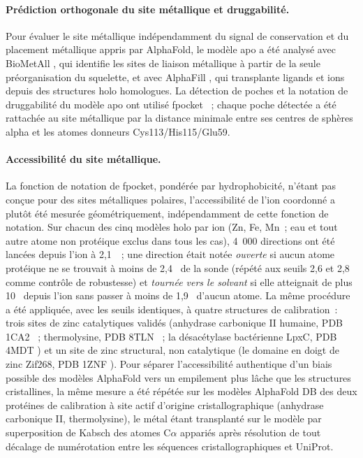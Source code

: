 \documentclass[11pt,a4paper]{article}
\newcommand{\ang}{\text{\AA}}
\begin{document}
\paragraph{Prédiction orthogonale du site métallique et druggabilité.} Pour évaluer le site métallique indépendamment du signal de conservation et du placement métallique appris par AlphaFold, le modèle apo a été analysé avec BioMetAll \citep{sanchezaparicio2021biometall}, qui identifie les sites de liaison métallique à partir de la seule préorganisation du squelette, et avec AlphaFill \citep{hekkelman2023alphafill}, qui transplante ligands et ions depuis des structures holo homologues. La détection de poches et la notation de druggabilité du modèle apo ont utilisé fpocket \citep{leguilloux2009fpocket}~; chaque poche détectée a été rattachée au site métallique par la distance minimale entre ses centres de sphères alpha et les atomes donneurs Cys113/His115/Glu59.

\paragraph{Accessibilité du site métallique.} La fonction de notation de fpocket, pondérée par hydrophobicité, n'étant pas conçue pour des sites métalliques polaires, l'accessibilité de l'ion coordonné a plutôt été mesurée géométriquement, indépendamment de cette fonction de notation. Sur chacun des cinq modèles holo par ion (Zn, Fe, Mn~; eau et tout autre atome non protéique exclus dans tous les cas), 4~000 directions ont été lancées depuis l'ion à 2,1~\ang{}~; une direction était notée \emph{ouverte} si aucun atome protéique ne se trouvait à moins de 2,4~\ang{} de la sonde (répété aux seuils 2,6 et 2,8~\ang{} comme contrôle de robustesse) et \emph{tournée vers le solvant} si elle atteignait de plus 10~\ang{} depuis l'ion sans passer à moins de 1,9~\ang{} d'aucun atome. La même procédure a été appliquée, avec les seuils identiques, à quatre structures de calibration~: trois sites de zinc catalytiques validés (anhydrase carbonique II humaine, PDB 1CA2 \citep{eriksson1988carbonicanhydrase}~; thermolysine, PDB 8TLN \citep{holland1992thermolysin}~; la désacétylase bactérienne LpxC, PDB 4MDT \citep{clayton2013lpxc}) et un site de zinc structural, non catalytique (le domaine en doigt de zinc Zif268, PDB 1ZNF \citep{lee1989zincfinger}). Pour séparer l'accessibilité authentique d'un biais possible des modèles AlphaFold vers un empilement plus lâche que les structures cristallines, la même mesure a été répétée sur les modèles AlphaFold DB des deux protéines de calibration à site actif d'origine cristallographique (anhydrase carbonique II, thermolysine), le métal étant transplanté sur le modèle par superposition de Kabsch des atomes C$\alpha$ appariés après résolution de tout décalage de numérotation entre les séquences cristallographiques et UniProt.
\end{document}

